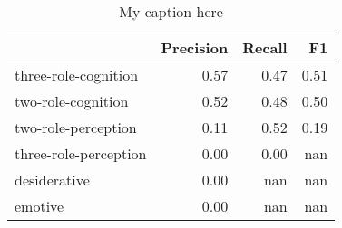 \begin{table}[!ht]
\centering
\begin{tabular}{lrrr}
\toprule
{} &  Precision &  Recall &   F1 \\
\midrule
three-role-cognition  &       0.57 &    0.47 & 0.51 \\
two-role-cognition    &       0.52 &    0.48 & 0.50 \\
two-role-perception   &       0.11 &    0.52 & 0.19 \\
three-role-perception &       0.00 &    0.00 &  nan \\
desiderative          &       0.00 &     nan &  nan \\
emotive               &       0.00 &     nan &  nan \\
\bottomrule
\end{tabular}
\caption{My caption here}
\label{tab:MENTAL-oe-combined-F1}
\end{table}